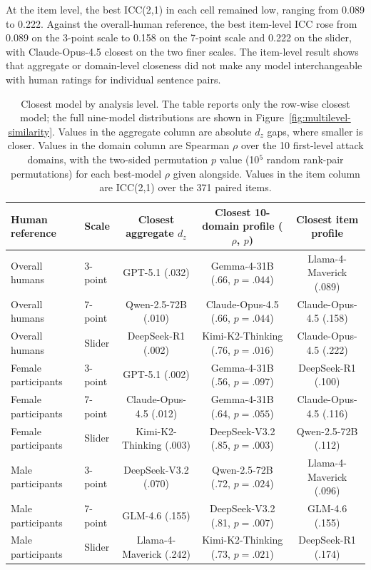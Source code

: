 \documentclass[a4paper,fleqn,review]{cas-sc}
\begin{document}
At the item level, the best ICC(2,1) in each cell remained low, ranging from 0.089 to 0.222. Against the overall-human reference, the best item-level ICC rose from 0.089 on the 3-point scale to 0.158 on the 7-point scale and 0.222 on the slider, with Claude-Opus-4.5 closest on the two finer scales. The item-level result shows that aggregate or domain-level closeness did not make any model interchangeable with human ratings for individual sentence pairs.

\begin{table}[pos=t]
  \centering
  \setlength{\tabcolsep}{3.2pt}
  \begin{tabular}{llccc}
    \toprule
    Human reference & Scale & Closest aggregate $d_z$ & Closest 10-domain profile ($\rho$, $p$) & Closest item profile \\
    \midrule
    Overall humans & 3-point & GPT-5.1 (.032) & Gemma-4-31B (.66, $p=.044$) & Llama-4-Maverick (.089) \\
    Overall humans & 7-point & Qwen-2.5-72B (.010) & Claude-Opus-4.5 (.66, $p=.044$) & Claude-Opus-4.5 (.158) \\
    Overall humans & Slider & DeepSeek-R1 (.002) & Kimi-K2-Thinking (.76, $p=.016$) & Claude-Opus-4.5 (.222) \\
    Female participants & 3-point & GPT-5.1 (.002) & Gemma-4-31B (.56, $p=.097$) & DeepSeek-R1 (.100) \\
    Female participants & 7-point & Claude-Opus-4.5 (.012) & Gemma-4-31B (.64, $p=.055$) & Claude-Opus-4.5 (.116) \\
    Female participants & Slider & Kimi-K2-Thinking (.003) & DeepSeek-V3.2 (.85, $p=.003$) & Qwen-2.5-72B (.112) \\
    Male participants & 3-point & DeepSeek-V3.2 (.070) & Qwen-2.5-72B (.72, $p=.024$) & Llama-4-Maverick (.096) \\
    Male participants & 7-point & GLM-4.6 (.155) & DeepSeek-V3.2 (.81, $p=.007$) & GLM-4.6 (.155) \\
    Male participants & Slider & Llama-4-Maverick (.242) & Kimi-K2-Thinking (.73, $p=.021$) & DeepSeek-R1 (.174) \\
    \bottomrule
  \end{tabular}
  \caption{Closest model by analysis level. The table reports only the row-wise closest model; the full nine-model distributions are shown in Figure~\ref{fig:multilevel-similarity}. Values in the aggregate column are absolute $d_z$ gaps, where smaller is closer. Values in the domain column are Spearman $\rho$ over the 10 first-level attack domains, with the two-sided permutation $p$ value (10$^{5}$ random rank-pair permutations) for each best-model $\rho$ given alongside. Values in the item column are ICC(2,1) over the 371 paired items.}
  \label{tab:multilevel-top-models}
\end{table}
\end{document}
